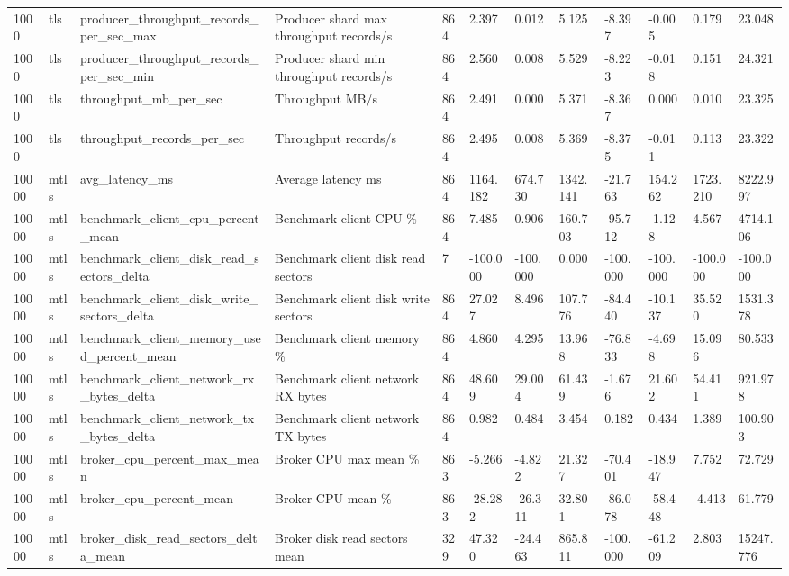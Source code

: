 \begin{longtable}{llllllllllll}
1000 & tls & producer\_throughput\_records\_per\_sec\_max & Producer shard max throughput records/s & 864 & 2.397 & 0.012 & 5.125 & -8.397 & -0.005 & 0.179 & 23.048 \\
1000 & tls & producer\_throughput\_records\_per\_sec\_min & Producer shard min throughput records/s & 864 & 2.560 & 0.008 & 5.529 & -8.223 & -0.018 & 0.151 & 24.321 \\
1000 & tls & throughput\_mb\_per\_sec & Throughput MB/s & 864 & 2.491 & 0.000 & 5.371 & -8.367 & 0.000 & 0.010 & 23.325 \\
1000 & tls & throughput\_records\_per\_sec & Throughput records/s & 864 & 2.495 & 0.008 & 5.369 & -8.375 & -0.011 & 0.113 & 23.322 \\
10000 & mtls & avg\_latency\_ms & Average latency ms & 864 & 1164.182 & 674.730 & 1342.141 & -21.763 & 154.262 & 1723.210 & 8222.997 \\
10000 & mtls & benchmark\_client\_cpu\_percent\_mean & Benchmark client CPU \% & 864 & 7.485 & 0.906 & 160.703 & -95.712 & -1.128 & 4.567 & 4714.106 \\
10000 & mtls & benchmark\_client\_disk\_read\_sectors\_delta & Benchmark client disk read sectors & 7 & -100.000 & -100.000 & 0.000 & -100.000 & -100.000 & -100.000 & -100.000 \\
10000 & mtls & benchmark\_client\_disk\_write\_sectors\_delta & Benchmark client disk write sectors & 864 & 27.027 & 8.496 & 107.776 & -84.440 & -10.137 & 35.520 & 1531.378 \\
10000 & mtls & benchmark\_client\_memory\_used\_percent\_mean & Benchmark client memory \% & 864 & 4.860 & 4.295 & 13.968 & -76.833 & -4.698 & 15.096 & 80.533 \\
10000 & mtls & benchmark\_client\_network\_rx\_bytes\_delta & Benchmark client network RX bytes & 864 & 48.609 & 29.004 & 61.439 & -1.676 & 21.602 & 54.411 & 921.978 \\
10000 & mtls & benchmark\_client\_network\_tx\_bytes\_delta & Benchmark client network TX bytes & 864 & 0.982 & 0.484 & 3.454 & 0.182 & 0.434 & 1.389 & 100.903 \\
10000 & mtls & broker\_cpu\_percent\_max\_mean & Broker CPU max mean \% & 863 & -5.266 & -4.822 & 21.327 & -70.401 & -18.947 & 7.752 & 72.729 \\
10000 & mtls & broker\_cpu\_percent\_mean & Broker CPU mean \% & 863 & -28.282 & -26.311 & 32.801 & -86.078 & -58.448 & -4.413 & 61.779 \\
10000 & mtls & broker\_disk\_read\_sectors\_delta\_mean & Broker disk read sectors mean & 329 & 47.320 & -24.463 & 865.811 & -100.000 & -61.209 & 2.803 & 15247.776 \\

\end{longtable}
